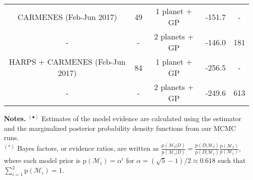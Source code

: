 \begin{table*}
\begin{tabular}{ccccc}
CARMENES (Feb-Jun 2017) & 49 & 1 planet + GP & -151.7 & - \\
- & - & 2 planets + GP & -146.0 & 181 \\
HARPS + CARMENES (Feb-Jun 2017) & 84 & 1 planet + GP & -256.5 & - \\
- & - & 2 planets + GP & -249.6 & 613 \\
\hline
\end{tabular}
\begin{list}{}{}
\item {\bf{Notes.}}
      $^{(\bullet)}$ Estimates of the model evidence are calculated using the \cite{perrakis13} estimator and the
  marginalized posterior probability density functions from our MCMC runs. \\
  $^{(\ast)}$ Bayes factors, or evidence ratios, are written as
  $\frac{\text{p}(\mathcal{M}_2|D)}{\text{p}(\mathcal{M}_1|D)} = \frac{\text{p}(D|\mathcal{M}_2)}{\text{p}(D|\mathcal{M}_1)} \frac{\text{p}(\mathcal{M}_2)}{\text{p}(\mathcal{M}_1)}$, where each model prior is $\text{p}(\mathcal{M}_i) = \alpha^i$ for
  $\alpha = (\sqrt{5}-1)/2 \approx 0.618$ such that $\sum_{i=1}^{2} \text{p}(\mathcal{M}_i) = 1$.
\end{list}
\end{table*}
